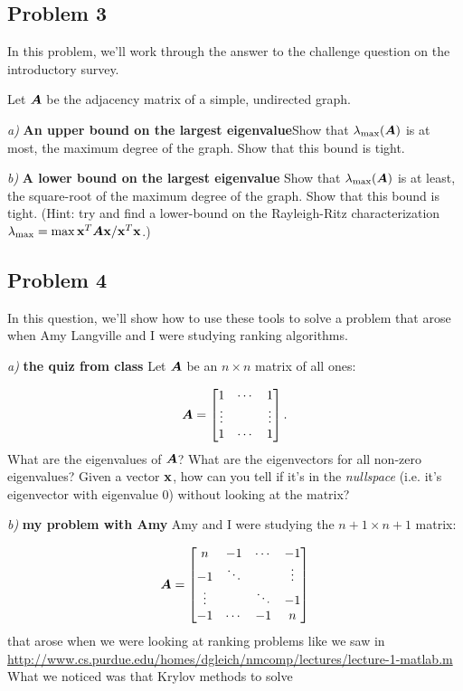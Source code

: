 \documentclass{article}
\begin{document}
\hypertarget{problem_3_5}{}\subsection*{{Problem 3}}\label{problem_3_5}

In this problem, we'{}ll work through the answer to the challenge question on the introductory survey.

Let $\boldsymbol{A}$ be the adjacency matrix of a simple, undirected graph.

\emph{a)} \textbf{An upper bound on the largest eigenvalue}\newline Show that $\lambda_{\max}(\boldsymbol{A})$ is at most, the maximum degree of the graph. Show that this bound is tight.

\emph{b)} \textbf{A lower bound on the largest eigenvalue} Show that $\lambda_{\max}(\boldsymbol{A})$ is at least, the square-root of the maximum degree of the graph. Show that this bound is tight. (Hint: try and find a lower-bound on the Rayleigh-Ritz characterization $\lambda_{\max} = \max \boldsymbol{\mathrm{x}}^T \boldsymbol{A} \boldsymbol{\mathrm{x}} / \boldsymbol{\mathrm{x}}^T \boldsymbol{\mathrm{x}}$.)

\hypertarget{problem_4_6}{}\subsection*{{Problem 4}}\label{problem_4_6}

In this question, we'{}ll show how to use these tools to solve a problem that arose when Amy Langville and I were studying ranking algorithms.

\emph{a)} \textbf{the quiz from class} Let $\boldsymbol{A}$ be an $n \times n$ matrix of all ones:

\begin{displaymath}
\boldsymbol{A} = \begin{bmatrix}  1 & \cdots & 1 \\                \vdots & & \vdots \\
                1 & \cdots & 1  \end{bmatrix}.
\end{displaymath}
What are the eigenvalues of $\boldsymbol{A}$? What are the eigenvectors for all non-zero eigenvalues? Given a vector $\boldsymbol{\mathrm{x}}$, how can you tell if it'{}s in the \emph{nullspace} (i.e. it'{}s eigenvector with eigenvalue 0) without looking at the matrix?

\emph{b)} \textbf{my problem with Amy} Amy and I were studying the $n+1 \times n+1$ matrix:

\begin{displaymath}
\boldsymbol{A} = \begin{bmatrix}  n & -1 & \cdots & -1 \\                -1 & \ddots & & \vdots \\
                \vdots & & \ddots & -1 \\
                -1 & \cdots & -1 & n  \end{bmatrix}
\end{displaymath}
that arose when we were looking at ranking problems like we saw in \url{http://www.cs.purdue.edu/homes/dgleich/nmcomp/lectures/lecture-1-matlab.m} What we noticed was that Krylov methods to solve
\end{document}
